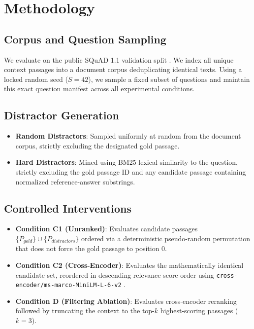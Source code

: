 \documentclass[conference]{IEEEtran}
\begin{document}
\section{Methodology}
\subsection{Corpus and Question Sampling}
We evaluate on the public SQuAD 1.1 validation split \cite{rajpurkar2016squad}. We index all unique context passages into a document corpus deduplicating identical texts. Using a locked random seed ($S=42$), we sample a fixed subset of questions and maintain this exact question manifest across all experimental conditions.

\subsection{Distractor Generation}
\begin{itemize}
    \item \textbf{Random Distractors}: Sampled uniformly at random from the document corpus, strictly excluding the designated gold passage.
    \item \textbf{Hard Distractors}: Mined using BM25 lexical similarity \cite{robertson2009probabilistic} to the question, strictly excluding the gold passage ID and any candidate passage containing normalized reference-answer substrings.
\end{itemize}

\subsection{Controlled Interventions}
\begin{itemize}
    \item \textbf{Condition C1 (Unranked)}: Evaluates candidate passages $\{P_{gold}\} \cup \{P_{distractors}\}$ ordered via a deterministic pseudo-random permutation that does not force the gold passage to position 0.
    \item \textbf{Condition C2 (Cross-Encoder)}: Evaluates the mathematically identical candidate set, reordered in descending relevance score order using \texttt{cross-encoder/ms-marco-MiniLM-L-6-v2} \cite{reimers2019sentence}.
    \item \textbf{Condition D (Filtering Ablation)}: Evaluates cross-encoder reranking followed by truncating the context to the top-$k$ highest-scoring passages ($k=3$).
\end{itemize}
\end{document}
